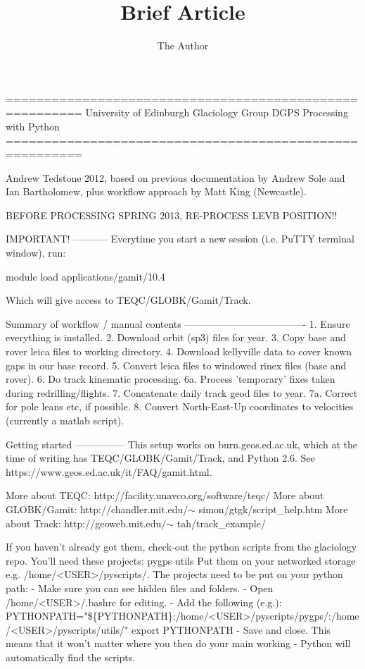 \documentclass[11pt]{article} %
\title{Brief Article}
\author{The Author}
\begin{document}
\maketitle

========================================================
University of Edinburgh Glaciology Group
DGPS Processing with Python
========================================================

Andrew Tedstone 2012, based on previous documentation by Andrew Sole and Ian Bartholomew, plus workflow approach by Matt King (Newcastle).

BEFORE PROCESSING SPRING 2013, RE-PROCESS LEVB POSITION!!
 
IMPORTANT!
-----------
Everytime you start a new session (i.e. PuTTY terminal window), run:

	module load applications/gamit/10.4

Which will give access to TEQC/GLOBK/Gamit/Track.


Summary of workflow / manual contents
-------------------------------------
1. Ensure everything is installed.
2. Download orbit (sp3) files for year.
3. Copy base and rover leica files to working directory.
4. Download kellyville data to cover known gaps in our base record.
5. Convert leica files to windowed rinex files (base and rover).
6. Do track kinematic processing.
    6a. Process 'temporary' fixes taken during redrilling/flights.
7. Concatenate daily track geod files to year.
    7a. Correct for pole leans etc, if possible.
8. Convert North-East-Up coordinates to velocities (currently a matlab script).

 

Getting started
---------------
This setup works on burn.geos.ed.ac.uk, which at the time of writing has TEQC/GLOBK/Gamit/Track, and Python 2.6.
See https://www.geos.ed.ac.uk/it/FAQ/gamit.html.

More about TEQC:
http://facility.unavco.org/software/teqc/
More about GLOBK/Gamit:
http://chandler.mit.edu/$\sim$ simon/gtgk/script_help.htm
More about Track:
http://geoweb.mit.edu/$\sim$ tah/track_example/

If you haven't already got them, check-out the python scripts from the glaciology repo.
You'll need these projects:
	pygps
	utils
Put them on your networked storage e.g. /home/<USER>/pyscripts/. 
The projects need to be put on your python path:
 - Make sure you can see hidden files and folders.
 - Open /home/<USER>/.bashrc for editing.
 - Add the following (e.g.):
		PYTHONPATH="\$\{PYTHONPATH\}:/home/<USER>/pyscripts/pygps/:/home/<USER>/pyscripts/utils/"
		export PYTHONPATH
 - Save and close.
This means that it won't matter where you then do your main working - Python will automatically find the scripts. 
\end{document}
